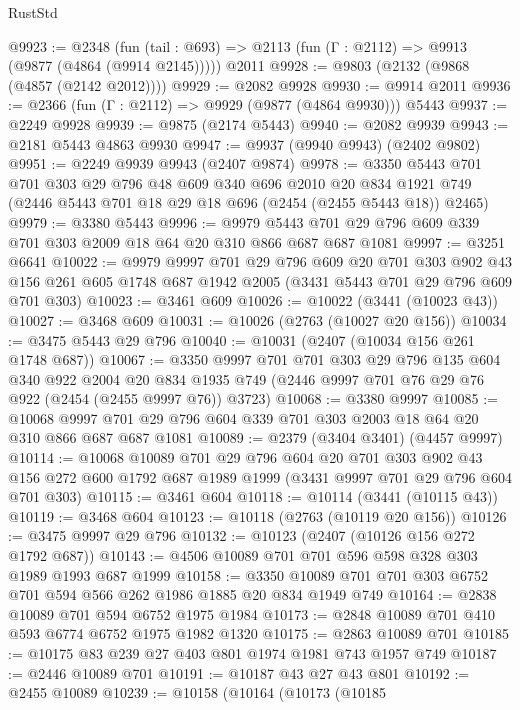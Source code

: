 \begin{lexlean}{RustStd}
\begin{coremodule}
@9923 := @2348
    (fun (tail : @693) => @2113 (fun (Γ : @2112) => @9913 (@9877 (@4864 (@9914 @2145)))))
    @2011
@9928 := @9803 (@2132 (@9868 (@4857 (@2142 @2012))))
@9929 := @2082 @9928
@9930 := @9914 @2011
@9936 := @2366 (fun (Γ : @2112) => @9929 (@9877 (@4864 @9930))) @5443
@9937 := @2249 @9928
@9939 := @9875 (@2174 @5443)
@9940 := @2082 @9939
@9943 := @2181 @5443 @4863 @9930
@9947 := @9937 (@9940 @9943) (@2402 @9802)
@9951 := @2249 @9939 @9943 (@2407 @9874)
@9978 := @3350
    @5443
    @701
    @701
    @303
    @29
    @796
    @48
    @609
    @340
    @696
    @2010
    @20
    @834
    @1921
    @749
    (@2446 @5443 @701 @18 @29 @18 @696 (@2454 (@2455 @5443 @18)) @2465)
@9979 := @3380 @5443
@9996 := @9979 @5443 @701 @29 @796 @609 @339 @701 @303 @2009 @18 @64 @20 @310 @866 @687 @687 @1081
@9997 := @3251 @6641
@10022 := @9979
    @9997
    @701
    @29
    @796
    @609
    @20
    @701
    @303
    @902
    @43
    @156
    @261
    @605
    @1748
    @687
    @1942
    @2005
    (@3431 @5443 @701 @29 @796 @609 @701 @303)
@10023 := @3461 @609
@10026 := @10022 (@3441 (@10023 @43))
@10027 := @3468 @609
@10031 := @10026 (@2763 (@10027 @20 @156))
@10034 := @3475 @5443 @29 @796
@10040 := @10031 (@2407 (@10034 @156 @261 @1748 @687))
@10067 := @3350
    @9997
    @701
    @701
    @303
    @29
    @796
    @135
    @604
    @340
    @922
    @2004
    @20
    @834
    @1935
    @749
    (@2446 @9997 @701 @76 @29 @76 @922 (@2454 (@2455 @9997 @76)) @3723)
@10068 := @3380 @9997
@10085 := @10068 @9997 @701 @29 @796 @604 @339 @701 @303 @2003 @18 @64 @20 @310 @866 @687 @687 @1081
@10089 := @2379 (@3404 @3401) (@4457 @9997)
@10114 := @10068
    @10089
    @701
    @29
    @796
    @604
    @20
    @701
    @303
    @902
    @43
    @156
    @272
    @600
    @1792
    @687
    @1989
    @1999
    (@3431 @9997 @701 @29 @796 @604 @701 @303)
@10115 := @3461 @604
@10118 := @10114 (@3441 (@10115 @43))
@10119 := @3468 @604
@10123 := @10118 (@2763 (@10119 @20 @156))
@10126 := @3475 @9997 @29 @796
@10132 := @10123 (@2407 (@10126 @156 @272 @1792 @687))
@10143 := @4506 @10089 @701 @701 @596 @598 @328 @303 @1989 @1993 @687 @1999
@10158 := @3350 @10089 @701 @701 @303 @6752 @701 @594 @566 @262 @1986 @1885 @20 @834 @1949 @749
@10164 := @2838 @10089 @701 @594 @6752 @1975 @1984
@10173 := @2848 @10089 @701 @410 @593 @6774 @6752 @1975 @1982 @1320
@10175 := @2863 @10089 @701
@10185 := @10175 @83 @239 @27 @403 @801 @1974 @1981 @743 @1957 @749
@10187 := @2446 @10089 @701
@10191 := @10187 @43 @27 @43 @801
@10192 := @2455 @10089
@10239 := @10158
    (@10164
      (@10173
        (@10185

\end{coremodule}
\end{lexlean}
